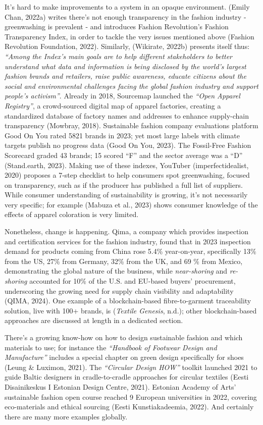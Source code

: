 \documentclass[
  12pt,
  letterpaper,
  DIV=11,
  numbers=noendperiod]{scrartcl}
\begin{document}
It's hard to make improvements to a system in an opaque environment.
(Emily Chan, 2022a) writes there's not enough transparency in the
fashion industry - greenwashing is prevalent - and introduces Fashion
Revolution's Fashion Transparency Index, in order to tackle the very
issues mentioned above (Fashion Revolution Foundation, 2022). Similarly,
(Wikirate, 2022b) presents itself thus: \emph{``Among the Index's main
goals are to help different stakeholders to better understand what data
and information is being disclosed by the world's largest fashion brands
and retailers, raise public awareness, educate citizens about the social
and environmental challenges facing the global fashion industry and
support people's activism''}. Already in 2018, Sourcemap launched the
\emph{``Open Apparel Registry''}, a crowd-sourced digital map of apparel
factories, creating a standardized database of factory names and
addresses to enhance supply-chain transparency (Mowbray, 2018).
Sustainable fashion company evaluations platform Good On You rated 5821
brands in 2023; yet most large labels with climate targets publish no
progress data (Good On You, 2023). The Fossil-Free Fashion Scorecard
graded 43 brands; 15 scored ``F'' and the sector average was a ``D''
(Stand.earth, 2023). Making use of these indexes, YouTuber
(imperfectidealist, 2020) proposes a 7-step checklist to help consumers
spot greenwashing, focused on transparency, such as if the producer has
published a full list of suppliers. While consumer understanding of
sustainability is growing, it's not necessarily very specific; for
example (Mabuza et al., 2023) shows consumer knowledge of the effects of
apparel coloration is very limited.

Nonetheless, change is happening. Qima, a company which provides
inspection and certification services for the fashion industry, found
that in 2023 inspection demand for products coming from China rose 5.4\%
year-on-year, specifically 13\% from the US, 27\% from Germany, 32\%
from the UK, and 69 \% from Mexico, demonstrating the global nature of
the business, while \emph{near-shoring} and \emph{re-shoring} accounted
for 10\% of the U.S. and EU-based buyers' procurement, underscoring the
growing need for supply chain visibility and adaptability (QIMA, 2024).
One example of a blockchain-based fibre-to-garment traceability
solution, live with 100+ brands, is (\emph{Textile {Genesis}}, n.d.);
other blockchain-based approaches are discussed at length in a dedicated
section.

There's a growing know-how on how to design sustainable fashion and
which materials to use; for instance the \emph{``Handbook of Footwear
Design and Manufacture''} includes a special chapter on green design
specifically for shoes (Leung \& Luximon, 2021). The \emph{``Circular
Design HOW''} toolkit launched 2021 to guide Baltic designers in
cradle-to-cradle approaches for circular textiles (Eesti Disainikeskus I
Estonian Design Centre, 2021). Estonian Academy of Arts' sustainable
fashion open course reached 9 European universities in 2022, covering
eco-materials and ethical sourcing (Eesti Kunstiakadeemia, 2022). And
certainly there are many more examples globally.
\end{document}
